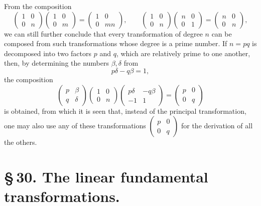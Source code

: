 \documentclass[11pt]{article}
\begin{document}
From the composition
\begin{equation}
\begin{pmatrix}1&0\\0&n\end{pmatrix}
\begin{pmatrix}1&0\\0&m\end{pmatrix}
=\begin{pmatrix}1&0\\0&mn\end{pmatrix},
\qquad
\begin{pmatrix}1&0\\0&n\end{pmatrix}
\begin{pmatrix}n&0\\0&1\end{pmatrix}
=\begin{pmatrix}n&0\\0&n\end{pmatrix}, \tag{7}
\end{equation}
we can still further conclude that every transformation of degree $n$ can be composed from such transformations whose degree is a prime number. If $n=pq$ is decomposed into two factors $p$ and $q$, which are relatively prime to one another, then, by determining the numbers $\beta,\delta$ from
\[
p\delta-q\beta=1,
\]
the composition
\[
\begin{pmatrix}p&\beta\\ q&\delta\end{pmatrix}
\begin{pmatrix}1&0\\0&n\end{pmatrix}
\begin{pmatrix}p\delta&-q\beta\\ -1&1\end{pmatrix}
=\begin{pmatrix}p&0\\0&q\end{pmatrix}
\]
is obtained, from which it is seen that, instead of the principal transformation, one may also use any of these transformations $\begin{pmatrix}p&0\\0&q\end{pmatrix}$ for the derivation of all the others.

\section*{\S\,30. The linear fundamental transformations.}
\end{document}
